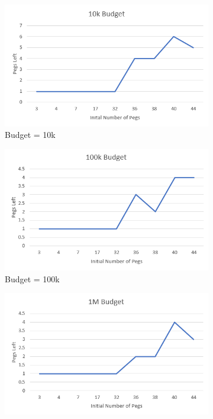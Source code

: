 \documentclass[12pt,a4paper]{article}
\begin{document}
\begin{figure}[H]
\centering
\begin{subfigure}{.5\textwidth}
  \centering
  \includegraphics[width=1\linewidth]{10k.png}
  \caption{Budget = 10k}
  \label{fig:sub1}
\end{subfigure}%
\begin{subfigure}{.5\textwidth}
  \centering
  \includegraphics[width=1\linewidth]{100k.png}
  \caption{Budget = 100k}
  \label{fig:sub2}
\end{subfigure}
\begin{subfigure}{.5\textwidth}
  \centering
  \includegraphics[width=1\linewidth]{1M.png}

\end{subfigure}
\end{figure}
\end{document}
